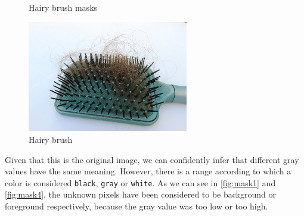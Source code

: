 \documentclass[a4paper]{article}
\begin{document}
\begin{figure}[h]
\caption{Hairy brush masks}
\end{figure}
%
\begin{figure}
    \vspace{-\intextsep}
    \includegraphics[width=7cm]{brushes/brush.jpg}
    \caption{Hairy brush}
\end{figure}

Given that this is the original image, we can confidently
infer that different gray values have the same meaning.
However, there is a range according to which a color is considered
\texttt{black}, \texttt{gray} or \texttt{white}.
As we can see in \ref{fig:mask1} and \ref{fig:mask4},
the unknown pixels have been considered to be background
or foreground respectively, because the gray value was too
low or too high.
\end{document}
